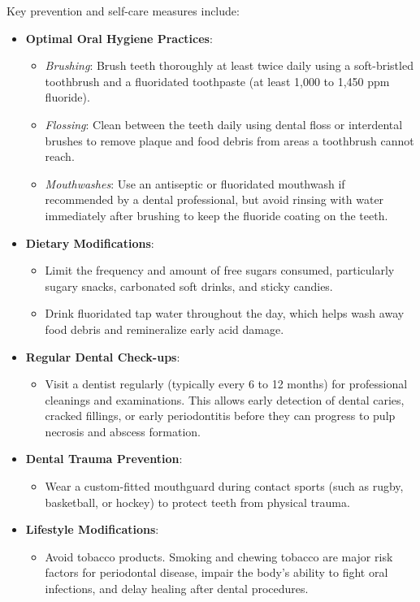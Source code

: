 Key prevention and self-care measures include:
\begin{itemize}
  \item \textbf{Optimal Oral Hygiene Practices}:
    \begin{itemize}
      \item \textit{Brushing}: Brush teeth thoroughly at least twice daily using a soft-bristled toothbrush and a fluoridated toothpaste (at least 1,000 to 1,450 ppm fluoride).
      \item \textit{Flossing}: Clean between the teeth daily using dental floss or interdental brushes to remove plaque and food debris from areas a toothbrush cannot reach.
      \item \textit{Mouthwashes}: Use an antiseptic or fluoridated mouthwash if recommended by a dental professional, but avoid rinsing with water immediately after brushing to keep the fluoride coating on the teeth.
    \end{itemize}
  \item \textbf{Dietary Modifications}:
    \begin{itemize}
      \item Limit the frequency and amount of free sugars consumed, particularly sugary snacks, carbonated soft drinks, and sticky candies.
      \item Drink fluoridated tap water throughout the day, which helps wash away food debris and remineralize early acid damage.
    \end{itemize}
  \item \textbf{Regular Dental Check-ups}:
    \begin{itemize}
      \item Visit a dentist regularly (typically every 6 to 12 months) for professional cleanings and examinations. This allows early detection of dental caries, cracked fillings, or early periodontitis before they can progress to pulp necrosis and abscess formation.
    \end{itemize}
  \item \textbf{Dental Trauma Prevention}:
    \begin{itemize}
      \item Wear a custom-fitted mouthguard during contact sports (such as rugby, basketball, or hockey) to protect teeth from physical trauma.
    \end{itemize}
  \item \textbf{Lifestyle Modifications}:
    \begin{itemize}
      \item Avoid tobacco products. Smoking and chewing tobacco are major risk factors for periodontal disease, impair the body's ability to fight oral infections, and delay healing after dental procedures.
    \end{itemize}
\end{itemize}

